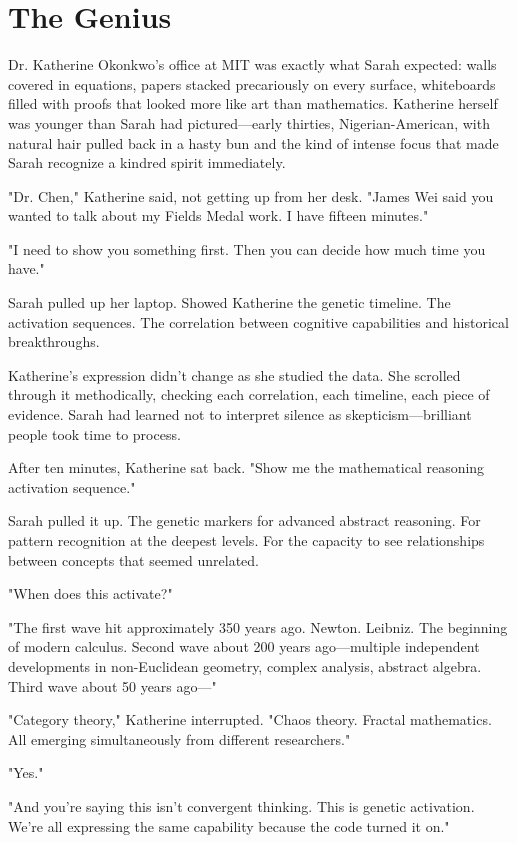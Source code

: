 \chapter{The Genius}
\label{ch:19}


Dr. Katherine Okonkwo's office at MIT was exactly what Sarah expected: walls covered in equations, papers stacked precariously on every surface, whiteboards filled with proofs that looked more like art than mathematics. Katherine herself was younger than Sarah had pictured—early thirties, Nigerian-American, with natural hair pulled back in a hasty bun and the kind of intense focus that made Sarah recognize a kindred spirit immediately.

"Dr. Chen," Katherine said, not getting up from her desk. "James Wei said you wanted to talk about my Fields Medal work. I have fifteen minutes."

"I need to show you something first. Then you can decide how much time you have."

Sarah pulled up her laptop. Showed Katherine the genetic timeline. The activation sequences. The correlation between cognitive capabilities and historical breakthroughs.

Katherine's expression didn't change as she studied the data. She scrolled through it methodically, checking each correlation, each timeline, each piece of evidence. Sarah had learned not to interpret silence as skepticism—brilliant people took time to process.

After ten minutes, Katherine sat back. "Show me the mathematical reasoning activation sequence."

Sarah pulled it up. The genetic markers for advanced abstract reasoning. For pattern recognition at the deepest levels. For the capacity to see relationships between concepts that seemed unrelated.

"When does this activate?"

"The first wave hit approximately 350 years ago. Newton. Leibniz. The beginning of modern calculus. Second wave about 200 years ago—multiple independent developments in non-Euclidean geometry, complex analysis, abstract algebra. Third wave about 50 years ago—"

"Category theory," Katherine interrupted. "Chaos theory. Fractal mathematics. All emerging simultaneously from different researchers."

"Yes."

"And you're saying this isn't convergent thinking. This is genetic activation. We're all expressing the same capability because the code turned it on."

